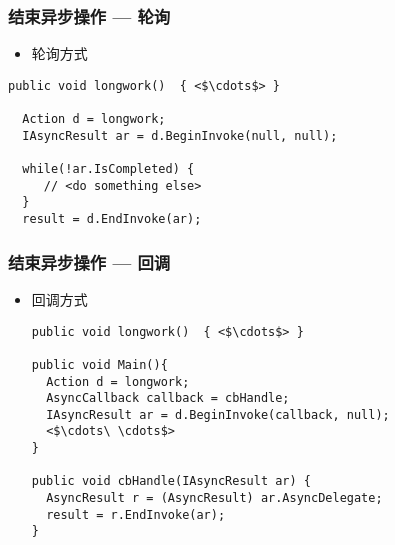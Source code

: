 \begin{frame}[fragile]
\frametitle{结束异步操作 --- 轮询}
\begin{itemize}
\item 轮询方式
\end{itemize}
\begin{lstlisting}[escapeinside=<>]
public void longwork()  { <$\cdots$> }

  Action d = longwork;
  IAsyncResult ar = d.BeginInvoke(null, null);
  
  while(!ar.IsCompleted) {
     // <do something else>
  }
  result = d.EndInvoke(ar);
\end{lstlisting}
\end{frame}

\begin{frame}[fragile]
\frametitle{结束异步操作 --- 回调}

\begin{itemize}
\item 回调方式
\begin{lstlisting}[escapeinside=<>]
public void longwork()  { <$\cdots$> }

public void Main(){
  Action d = longwork;
  AsyncCallback callback = cbHandle;
  IAsyncResult ar = d.BeginInvoke(callback, null);
  <$\cdots\ \cdots$>
}

public void cbHandle(IAsyncResult ar) {
  AsyncResult r = (AsyncResult) ar.AsyncDelegate;
  result = r.EndInvoke(ar);
}
\end{lstlisting}
\end{itemize}
\end{frame}

